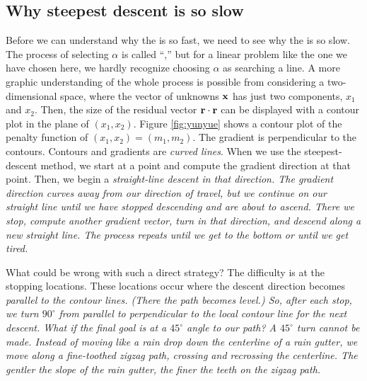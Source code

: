 \subsection{Why steepest descent is so slow}
Before we can understand why the  is so fast,
we need to see why the
is so slow.
The process of selecting $\alpha$ is called ``,''
but for a linear problem like the one we have chosen here,
we hardly recognize choosing $\alpha$ as searching a line.
A more graphic understanding of the whole process is possible
from considering a two-dimensional space,
where the vector of unknowns $\bold x$
has just two components, $x_1$ and $x_2$.
Then, the size of the residual vector $\bold r \cdot \bold r$ can be
displayed with a contour plot in the plane of $(x_1,x_2)$.
Figure \ref{fig:yunyue}
shows a contour plot of the penalty function
of $(x_1,x_2)=(m_1,m_2)$.
The gradient is perpendicular to the contours.
Contours and gradients are {\it curved lines}.
When we use the steepest-descent method, we start at a point
and compute the gradient direction at that point.
Then, we begin a %
\it straight-line %
\rm descent in that direction.
The gradient direction curves away from our direction of travel,
but we continue on our straight line
until we have stopped descending and are about to ascend.
There we stop, compute another gradient vector,
turn in that direction, and descend along a new straight line.
The process repeats until we get to the bottom
or until we get tired.


What could be wrong with such a direct strategy?
The difficulty is at the stopping locations.
These locations occur where the descent direction
becomes %
\it parallel %
\rm to the contour lines.
(There the path becomes level.)
So, after each stop, we turn $90^\circ$
from parallel to perpendicular to the local contour line
for the next descent.
What if the final goal is at a $45^\circ$ angle to our path?
A $45^\circ$ turn cannot be made.
Instead of moving like a rain drop down the centerline of a rain gutter,
we move along a fine-toothed zigzag path,
crossing and recrossing the centerline.
The gentler the slope of the rain gutter,
the finer the teeth on the zigzag path.

